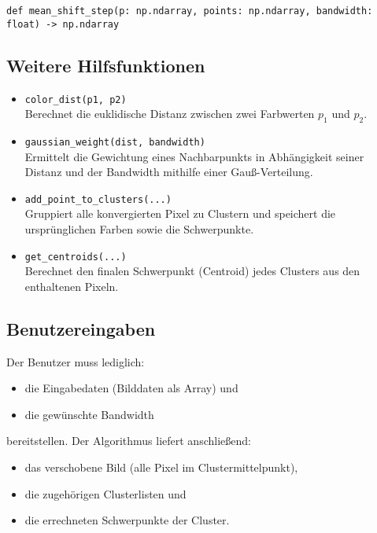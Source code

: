 \begin{verbatim}
def mean_shift_step(p: np.ndarray, points: np.ndarray, bandwidth: float) -> np.ndarray
\end{verbatim}


\subsection*{Weitere Hilfsfunktionen}

\begin{itemize}
    \item \texttt{color\_dist(p1, p2)} \\
    Berechnet die euklidische Distanz zwischen zwei Farbwerten $p_1$ und $p_2$.

    \item \texttt{gaussian\_weight(dist, bandwidth)} \\
    Ermittelt die Gewichtung eines Nachbarpunkts in Abhängigkeit seiner Distanz und der Bandwidth mithilfe einer Gauß-Verteilung.

    \item \texttt{add\_point\_to\_clusters(...)} \\
    Gruppiert alle konvergierten Pixel zu Clustern und speichert die ursprünglichen Farben sowie die Schwerpunkte.

    \item \texttt{get\_centroids(...)} \\
    Berechnet den finalen Schwerpunkt (Centroid) jedes Clusters aus den enthaltenen Pixeln.
\end{itemize}

\subsection*{Benutzereingaben}

Der Benutzer muss lediglich:

\begin{itemize}
    \item die Eingabedaten (Bilddaten als Array) und
    \item die gewünschte Bandwidth
\end{itemize}

bereitstellen. Der Algorithmus liefert anschließend:
\begin{itemize}
    \item das verschobene Bild (alle Pixel im Clustermittelpunkt),
    \item die zugehörigen Clusterlisten und
    \item die errechneten Schwerpunkte der Cluster.
\end{itemize}

\newpage
